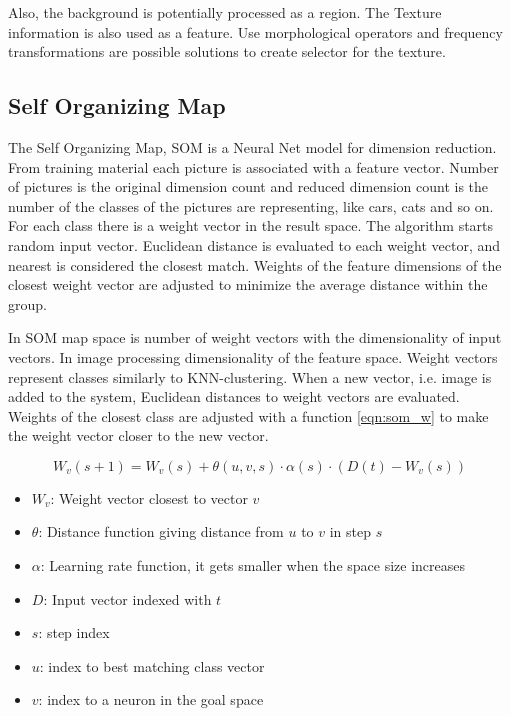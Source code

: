 \documentclass[doc/report.tex]{subfiles}
\begin{document}
Also, the background is potentially processed as a region. The Texture
information is also used as a feature. Use morphological operators and
frequency transformations are possible solutions to create selector for the
texture.


\subsection{Self Organizing Map}
The Self Organizing Map, SOM is a Neural Net model for dimension reduction.
From training material each picture is associated with a feature vector. Number
of pictures is the original dimension count and reduced dimension count is the
number of the classes of the pictures are representing, like cars, cats and so
on. For each class there is a weight vector in  the result space. The algorithm
starts random input vector. Euclidean distance is evaluated to each weight
vector, and nearest is considered the closest match. Weights of the feature
dimensions of the closest weight vector are adjusted to minimize the average
distance within the group.

In SOM map space is number of weight vectors with the dimensionality of input
vectors. In image processing dimensionality of the feature space. Weight
vectors represent classes similarly to KNN-clustering. When a new vector, i.e.
image is added to the system, Euclidean distances to weight vectors are
evaluated. Weights of the closest class are adjusted with a function
\eqref{eqn:som_w} to make the weight vector closer to the new vector.

\begin{equation}
    W_v(s+1) = W_v(s) + \theta(u, v, s) \cdot \alpha(s) \cdot (D(t) - W_v(s))
    \label{eqn:som_w}
\end{equation}

\begin{itemize}
    \item $W_v$: Weight vector closest to vector $v$
    \item $\theta$: Distance function giving distance from $u$ to $v$ in step
        $s$
    \item $\alpha$: Learning rate function, it gets smaller when the space size
        increases
    \item $D$: Input vector indexed with $t$
    \item $s$: step index
    \item $u$: index to best matching class vector
    \item $v$: index to a neuron in the goal space
\end{itemize}
\end{document}
